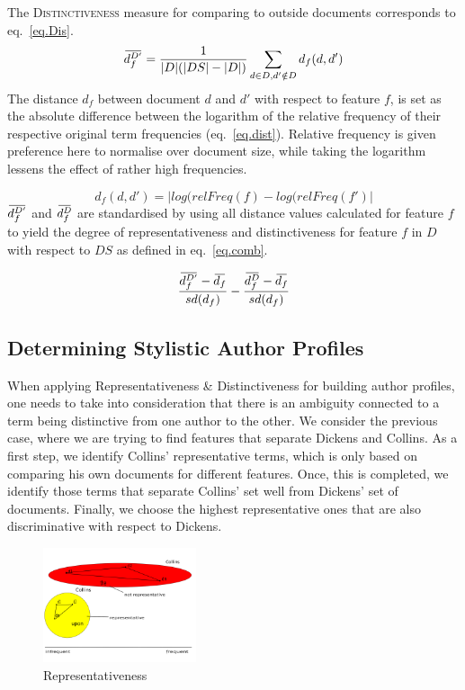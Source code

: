 \documentclass[a4paper,10pt,twoside,fleqn]{article}
\newcommand{\overbar}[1]{\mkern 2.0mu\overline{\mkern-2.0mu#1\mkern-2.0mu}\mkern 2.0mu}
\begin{document}
The \textsc{Distinctiveness} measure for comparing to outside documents corresponds 
to eq.~\ref{eq.Dis}.\\


\begin{equation}\label{eq.Dis}
 \overbar{d_f^{D'}} = \frac{1}{|D|(|DS| -|D|)} \sum\limits_{d \in D, d'\notin D} d_f(d,d')
\end{equation}
The distance $d_f$ between document $d$ and $d'$ with respect to feature $f$, is set as the 
absolute difference between the logarithm of the relative frequency of their respective
original term frequencies (eq.~\ref{eq.dist}).
Relative frequency is given preference here to normalise over document size, while 
taking the logarithm lessens the effect of rather high frequencies.

\begin{equation} \label{eq.dist}
 d_f(d,d') = |log(relFreq(f) - log(relFreq(f')|
\end{equation}
$\overbar{d_f^{D'}}$  and $\overbar{d_f^{D}}$ are standardised by using all 
distance values calculated for feature $f$ to yield the 
degree of representativeness and distinctiveness for
feature $f$ in $D$ with respect to $DS$ as defined in eq.~\ref{eq.comb}.
 
 \begin{equation}\label{eq.comb}
\frac{\overbar{d^{D'}_f} - \overbar{d_f} }{sd(d_f)} - \frac{\overbar{d^{D}_f} - \overbar{d_f}}{sd(d_f)}
\end{equation}


\subsection{Determining Stylistic Author Profiles}

When applying Representativeness \& Distinctiveness for building author profiles, 
one needs to take into consideration that there is an ambiguity connected to 
a term being  distinctive from one author to the other. 
We consider the previous case, where we are trying to find features that 
separate Dickens and Collins. 
As a first step, we identify Collins' representative terms, which is only based on
comparing his own documents for different features. Once, this is completed, 
we identify those terms that separate Collins' set well from Dickens' set
of documents. 
Finally, we choose the highest representative ones that are also
discriminative with respect to Dickens. 

\begin{figure}
  \caption{Representativeness}
 \begin{center}
  \includegraphics[width=0.4\textwidth]{figures/repres1-fin.png}
  \end{center}
 \end{figure}
 
\end{document}
